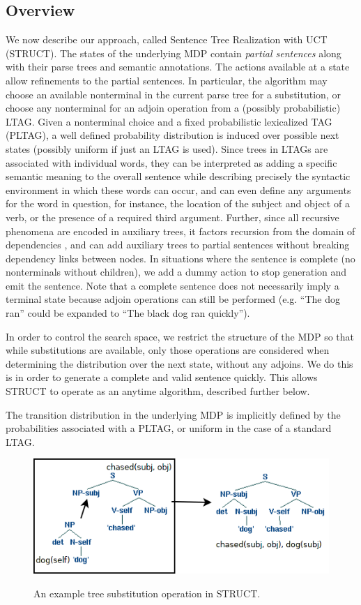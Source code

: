 \subsection{Overview}
We now describe our approach, called Sentence Tree Realization with
UCT (STRUCT). The states of the underlying MDP contain {\em partial
 sentences} along with their parse trees and semantic annotations.
The actions available at a
state allow refinements to the partial sentences. In particular, the
algorithm may choose an available nonterminal in the current parse
tree for a substitution, or choose any nonterminal for an adjoin operation from a (possibly
probabilistic) LTAG. Given a nonterminal choice and a fixed
probabilistic lexicalized TAG (PLTAG), a well defined probability
distribution is induced over possible next states (possibly uniform if
just an LTAG is used).   Since trees in LTAGs are associated
with individual words, they can be interpreted as adding a specific
semantic meaning to the overall sentence while describing precisely
the syntactic environment in which these words can occur, and can even
define any arguments for the word in question, for instance, the
location of the subject and object of a verb, or the presence of a
required third argument.  Further, since all recursive phenomena are
encoded in auxiliary trees, it factors recursion from the domain of
dependencies \cite{bauer2009statistical}, and can add auxiliary trees
to partial sentences without breaking dependency links between nodes.
In situations where the sentence is complete (no nonterminals without
children), we add a dummy action to stop generation and emit the
sentence.  Note that a complete sentence does not necessarily imply
a terminal state because adjoin operations can still be performed
(e.g. ``The dog ran'' could be expanded to ``The black dog ran quickly'').

In order to control the search space, we restrict the structure of the
MDP so that while substitutions are available, only those operations
are considered when determining the distribution over the next state,
without any adjoins.  We do this is in order to generate a
complete and valid sentence quickly.  This allows STRUCT to operate as
an anytime algorithm, described further below.

 The transition distribution in
 the underlying MDP is implicitly defined by the probabilities
 associated with a PLTAG, or uniform in the case of a standard LTAG.
\begin{figure}[t]
\centering
\includegraphics[width= 0.7 \linewidth]{sub-example.png}\label{examples-s}
\caption{An example tree substitution operation in STRUCT.}
\end{figure}

